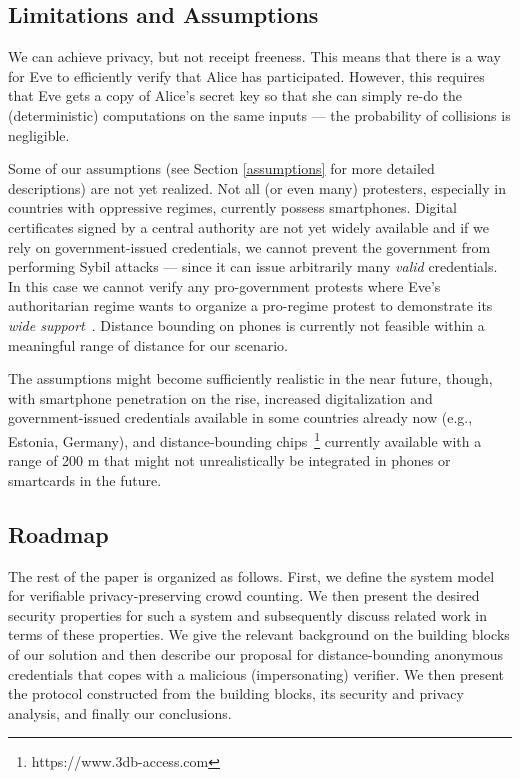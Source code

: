 \subsection{Limitations and Assumptions}

We can achieve privacy, but not receipt freeness.
This means that there is a way for Eve to efficiently verify that Alice has 
participated.
However, this requires that Eve gets a copy of Alice's secret key so that she 
can simply re-do the (deterministic) computations on the same inputs --- the 
probability of collisions is negligible.


Some of our assumptions (see Section \ref{assumptions} for more
detailed descriptions) are not yet
realized. Not all (or even many) protesters, especially in countries
with oppressive regimes, currently possess smartphones. Digital
certificates signed by a central authority are not yet widely
available and if we rely on government-issued credentials, we cannot prevent the government 
from performing Sybil attacks --- since it can issue arbitrarily many 
\emph{valid} credentials. In this case we cannot verify any pro-government protests where Eve's authoritarian regime wants to organize a pro-regime protest to 
demonstrate its \emph{wide 
  support}~\cite[e.g.][]{AlJazeeraOnVenezuela2017,VenezuelanStateWorkersCalledToParticipate}.
Distance bounding on phones is currently not feasible within a
meaningful range of distance for our scenario. 

The assumptions might
become sufficiently realistic in the near future, though, with
smartphone penetration on the rise, increased digitalization and government-issued credentials
available in some countries already now (e.g., Estonia, Germany), and
distance-bounding chips~\footnote{ https://www.3db-access.com } currently available with a range of 200 m that
might not unrealistically be integrated in phones or smartcards in the
future. 

\subsection{Roadmap}
The rest of the paper is organized as follows. First, we define the
system model for verifiable privacy-preserving crowd counting.  We then
present the desired security properties for such a system and subsequently discuss related
work in terms of these properties. We give the relevant background on
the building blocks of our solution and then describe our proposal for
distance-bounding anonymous credentials that copes with a malicious
(impersonating) verifier. We then present the protocol constructed
from the building blocks, its security and privacy analysis, and
finally our conclusions. 